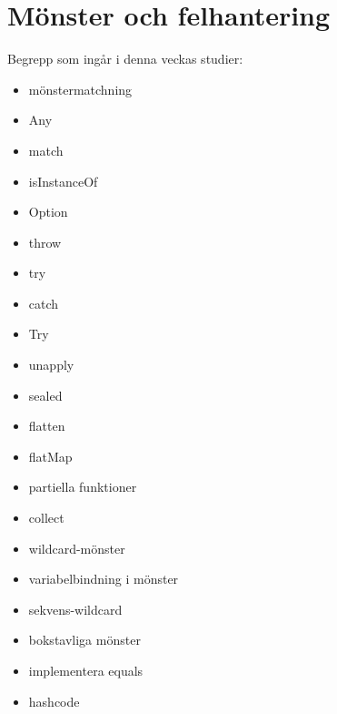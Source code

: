 \chapter{Mönster och felhantering}\label{chapter:W06}
Begrepp som ingår i denna veckas studier:
\begin{itemize}[noitemsep,label={$\square$},leftmargin=*]
\item mönstermatchning
\item Any
\item match
\item isInstanceOf
\item Option
\item throw
\item try
\item catch
\item Try
\item unapply
\item sealed
\item flatten
\item flatMap
\item partiella funktioner
\item collect
\item wildcard-mönster
\item variabelbindning i mönster
\item sekvens-wildcard
\item bokstavliga mönster
\item implementera equals
\item hashcode\end{itemize}
